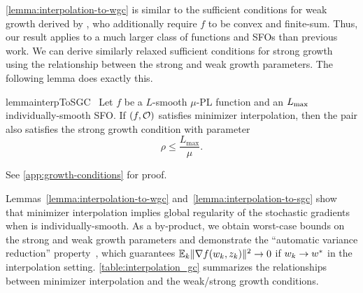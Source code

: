 \autoref{lemma:interpolation-to-wgc} is similar to the sufficient conditions for weak growth derived by \citet{vaswani2019fast}, who additionally require \( f \) to be convex and finite-sum. 
Thus, our result applies to a much larger class of functions and \acp{SFO} than previous work.
We can derive similarly relaxed sufficient conditions for strong growth using the relationship between the strong and weak growth parameters. 
The following lemma does exactly this.

\begin{restatable}{lemma}{interpToSGC}~\label{lemma:interpolation-to-sgc}
    Let \( f \) be a \( L \)-smooth  \( \mu \)-\ac{PL} function and \oracle{} an \( \Lmax \) individually-smooth \ac{SFO}.
    If \( \rbr{f, \oracle{}} \) satisfies minimizer interpolation, then the pair also satisfies the strong growth condition with parameter
    \[ \rho \leq \frac{L_{\text{max}}}{\mu}. \]
\end{restatable}
\noindent See \autoref{app:growth-conditions} for proof. \hfill \break

Lemmas~\ref{lemma:interpolation-to-wgc} and~\ref{lemma:interpolation-to-sgc} show that minimizer interpolation implies global regularity of the stochastic gradients when \oracle{} is individually-smooth. 
As a by-product, we obtain worst-case bounds on the strong and weak growth parameters and demonstrate the ``automatic variance reduction'' property~\citep{liu2020accelerating}, which guarantees \( \E_k\norm{\grad(\wk, \zk)}^2 \rightarrow 0 \) if \( \wk \rightarrow \wopt \) in the interpolation setting.
\autoref{table:interpolation_gc} summarizes the relationships between minimizer interpolation and the weak/strong growth conditions. 


